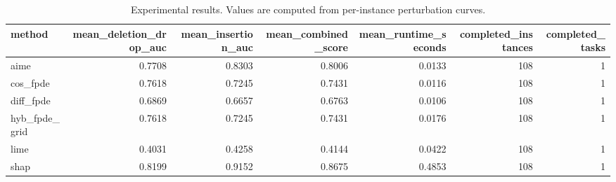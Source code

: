 \begin{table}[t]
\caption{Experimental results. Values are computed from per-instance perturbation curves.}
\label{tab:main_results_computed}
\centering
\begin{tabular}{lrrrrrr}
\toprule
method & mean\_deletion\_drop\_auc & mean\_insertion\_auc & mean\_combined\_score & mean\_runtime\_seconds & completed\_instances & completed\_tasks \\
\midrule
aime & 0.7708 & 0.8303 & 0.8006 & 0.0133 & 108 & 1 \\
cos\_fpde & 0.7618 & 0.7245 & 0.7431 & 0.0116 & 108 & 1 \\
diff\_fpde & 0.6869 & 0.6657 & 0.6763 & 0.0106 & 108 & 1 \\
hyb\_fpde\_grid & 0.7618 & 0.7245 & 0.7431 & 0.0176 & 108 & 1 \\
lime & 0.4031 & 0.4258 & 0.4144 & 0.0422 & 108 & 1 \\
shap & 0.8199 & 0.9152 & 0.8675 & 0.4853 & 108 & 1 \\
\bottomrule
\end{tabular}

\end{table}
